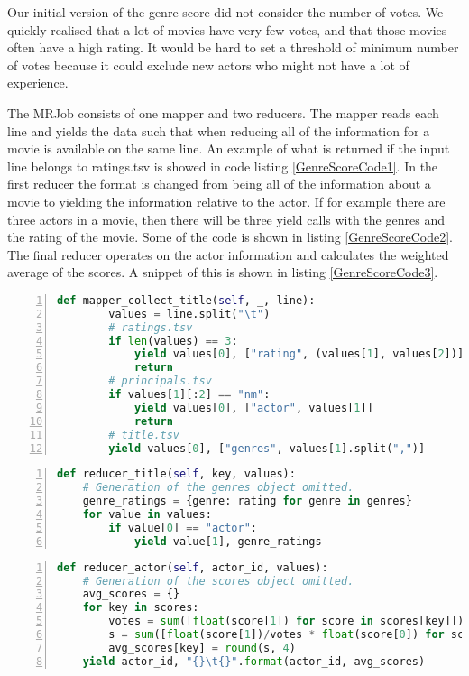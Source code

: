 Our initial version of the genre score did not consider the number of votes. We quickly realised that a lot of movies have very few votes, and that those movies often have a high rating. It would be hard to set a threshold of minimum number of votes because it could exclude new actors who might not have a lot of experience.

The MRJob consists of one mapper and two reducers. The mapper reads each line and yields the data such that when reducing all of the information for a movie is available on the same line. An example of what is returned if the input line belongs to ratings.tsv is showed in code listing \ref{GenreScoreCode1}. In the first reducer the format is changed from being all of the information about a movie to yielding the information relative to the actor. If for example there are three actors in a movie, then there will be three yield calls with the genres and the rating of the movie. Some of the code is shown in listing \ref{GenreScoreCode2}. The final reducer operates on the actor information and calculates the weighted average of the scores. A snippet of this is shown in listing \ref{GenreScoreCode3}.



\begin{lstlisting}[float=h!, language=Python, caption=Genre score mapper, label=GenreScoreCode1, numbers=left]
def mapper_collect_title(self, _, line):
        values = line.split("\t")
        # ratings.tsv
        if len(values) == 3:
            yield values[0], ["rating", (values[1], values[2])]
            return
        # principals.tsv
        if values[1][:2] == "nm":
            yield values[0], ["actor", values[1]]
            return
        # title.tsv
        yield values[0], ["genres", values[1].split(",")]
\end{lstlisting}



\begin{lstlisting}[float=h!, language=Python, caption=Genre score first reducer, label=GenreScoreCode2, numbers=left]
def reducer_title(self, key, values):
    # Generation of the genres object omitted.
    genre_ratings = {genre: rating for genre in genres}
    for value in values:
        if value[0] == "actor":
            yield value[1], genre_ratings
\end{lstlisting}

\begin{lstlisting}[float=h!, language=Python, caption=Genre score final reducer, label=GenreScoreCode3, numbers=left]
def reducer_actor(self, actor_id, values):
    # Generation of the scores object omitted.
    avg_scores = {}
    for key in scores:
        votes = sum([float(score[1]) for score in scores[key]])
        s = sum([float(score[1])/votes * float(score[0]) for score in scores[key]])
        avg_scores[key] = round(s, 4)
    yield actor_id, "{}\t{}".format(actor_id, avg_scores)
\end{lstlisting}



